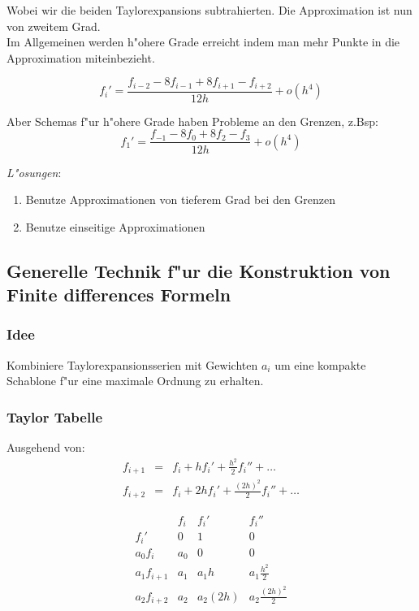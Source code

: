 \documentclass[german, 10pt, a4paper, twocolumn]{scrartcl}
\begin{document}
Wobei wir die beiden Taylorexpansions subtrahierten. Die Approximation ist nun von zweitem Grad.\\

Im Allgemeinen werden h"ohere Grade erreicht indem man mehr Punkte in die Approximation miteinbezieht.

\begin{displaymath}
	f_i' = \frac{f_{i-2}-8f_{i-1}+8f_{i+1}-f_{i+2}}{12 h}+o(h^4)
\end{displaymath}

Aber Schemas f"ur h"ohere Grade haben Probleme an den Grenzen, z.Bsp:
\begin{displaymath}
	f_1' = \frac{f_{-1}-8f_0 + 8 f_2 - f_3}{12h}+o(h^4)
\end{displaymath}

\textit{L"osungen}:
\begin{enumerate}
	\item Benutze Approximationen von tieferem Grad bei den Grenzen
	\item Benutze einseitige Approximationen
\end{enumerate}

\subsection{Generelle Technik f"ur die Konstruktion von Finite differences Formeln}

\subsubsection{Idee}

Kombiniere Taylorexpansionsserien mit Gewichten $a_i$ um eine kompakte Schablone f"ur eine maximale Ordnung zu erhalten.

\subsubsection{Taylor Tabelle}

Ausgehend von:
\begin{eqnarray}
	f_{i+1} &	= &	f_i + hf_i' + \frac{h^2}{2}f_i'' + \ldots  \nonumber \\
	f_{i+2} &	= &	f_i + 2hf_i' + \frac{(2h)^2}{2}f_i'' + \ldots \nonumber
\end{eqnarray}

\begin{displaymath}
	\begin{array}{c|cccc}
		 &		f_i &		f_i' &		f_i'' \\ \hline
		 f_i' &		0 &		1 &		0\\
		 a_0f_i &	a_0 &		0 &		0\\
		 a_1f_{i+1} &	a_1 &		a_1h &		a_1\frac{h^2}{2}\\
		 a_2f_{i+2} &	a_2 &		a_2(2h) &	a_2\frac{(2h)^2}{2}
	\end{array}
\end{displaymath}
\end{document}
